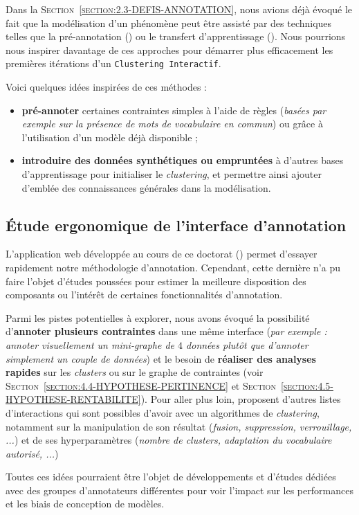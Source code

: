 		Dans la \textsc{Section~\ref{section:2.3-DEFIS-ANNOTATION}}, nous avions déjà évoqué le fait que la modélisation d'un phénomène peut être assisté par des techniques telles que la pré-annotation (\cite{dandapat-etal:2009:complex-linguistic-annotation}) ou le transfert d'apprentissage (\cite{zhuang-etal:2021:comprehensive-survey-transfer}).
		Nous pourrions nous inspirer davantage de ces approches pour démarrer plus efficacement les premières itérations d'un \texttt{Clustering Interactif}.
	
		Voici quelques idées inspirées de ces méthodes :
		\begin{itemize}
			\item \textbf{pré-annoter} certaines contraintes simples à l'aide de règles (\textit{basées par exemple sur la présence de mots de vocabulaire en commun}) ou grâce à l'utilisation d'un modèle déjà disponible ; 
			\item \textbf{introduire des données synthétiques ou empruntées} à d'autres bases d'apprentissage pour initialiser le \textit{clustering}, et permettre ainsi ajouter d'emblée des connaissances générales dans la modélisation.
		\end{itemize}
	
	
	\subsection{Étude ergonomique de l'interface d'annotation}
	\label{section:4.7.5-HYPOTHESES-NON-VERIFIEES-ERGONOMIQUE}
	
		L'application web développée au cours de ce doctorat (\cite{schild-etal:2022:cognitivefactory-interactiveclusteringgui}) permet d'essayer rapidement notre méthodologie d'annotation.
		Cependant, cette dernière n'a pu faire l'objet d'études poussées pour estimer la meilleure disposition des composants ou l'intérêt de certaines fonctionnalités d'annotation.
		
		Parmi les pistes potentielles à explorer, nous avons évoqué la possibilité d'\textbf{annoter plusieurs contraintes} dans une même interface (\textit{par exemple : annoter visuellement un mini-graphe de $4$ données plutôt que d'annoter simplement un couple de données}) et le besoin de \textbf{réaliser des analyses rapides} sur les \textit{clusters} ou sur le graphe de contraintes (voir \textsc{Section~\ref{section:4.4-HYPOTHESE-PERTINENCE}} et \textsc{Section~\ref{section:4.5-HYPOTHESE-RENTABILITE}}).
		Pour aller plus loin, \cite{bae-etal:2021:interactive-clustering-comprehensive} proposent d'autres listes d'interactions qui sont possibles d'avoir avec un algorithmes de \textit{clustering}, notamment sur la manipulation de son résultat (\textit{fusion, suppression, verrouillage, ...}) et de ses hyperparamètres (\textit{nombre de \textit{clusters}, adaptation du vocabulaire autorisé, ...})
		
		Toutes ces idées pourraient être l'objet de développements et d'études dédiées avec des groupes d'annotateurs différentes pour voir l'impact sur les performances et les biais de conception de modèles.